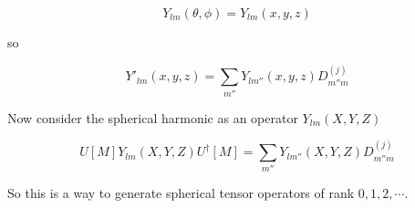 \begin{equation}\label{eqn:qmTwoL19:370}
Y_{l m}(\theta, \phi)  = Y_{lm}(x, y, z)
\end{equation}

so

\begin{equation}\label{eqn:qmTwoL19:390}
Y'_{l m}(x, y, z)
= 
\sum_{m''} 
Y_{l m''}(x, y, z)
D^{(j)}_{m'' m} 
\end{equation}

Now consider the spherical harmonic as an operator $Y_{l m}(X, Y, Z)$

\begin{equation}\label{eqn:qmTwoL19:410}
U[M] Y_{lm}(X, Y, Z) U^\dagger[M] =
\sum_{m''} 
Y_{l m''}(X, Y, Z)
D^{(j)}_{m'' m} 
\end{equation}

So this is a way to generate spherical tensor operators of rank $0, 1, 2, \cdots$.  

\EndArticle
